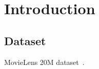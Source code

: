 \section{Introduction}
\label{sec:intro}

\subsection{Dataset}

MovieLens 20M dataset~\cite{movielens}.
